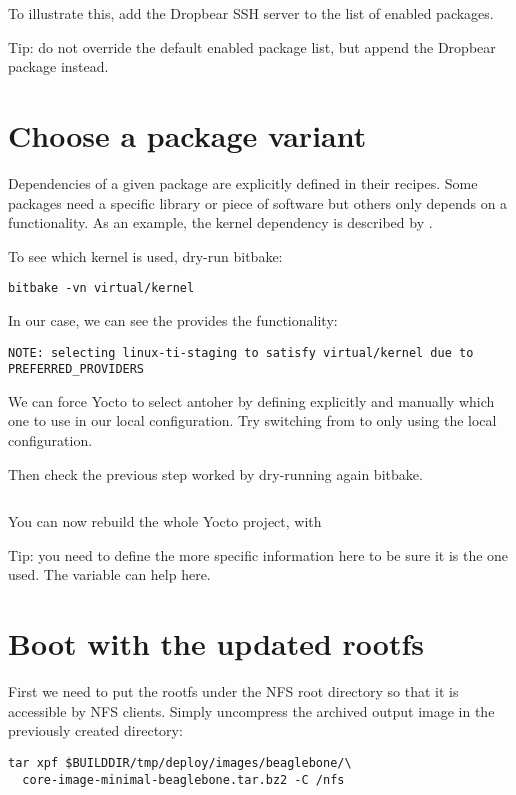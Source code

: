 To illustrate this, add the Dropbear SSH server to the list of enabled
packages.

Tip: do not override the default enabled package list, but append the Dropbear
package instead.

\section{Choose a package variant}

Dependencies of a given package are explicitly defined in their recipes. Some
packages need a specific library or piece of software but others only depends on
a functionality. As an example, the kernel dependency is described by
.

To see which kernel is used, dry-run bitbake:
\begin{verbatim}
bitbake -vn virtual/kernel
\end{verbatim}

In our case, we can see the  provides the
 functionality:
\begin{verbatim}
NOTE: selecting linux-ti-staging to satisfy virtual/kernel due to PREFERRED_PROVIDERS
\end{verbatim}

We can force Yocto to select antoher  by defining explicitly and
manually which one to use in our local configuration. Try switching from
 to  only using the local
configuration.

Then check the previous step worked by dry-running again bitbake.
\begin{verbatim}
\end{verbatim}

You can now rebuild the whole Yocto project, with 

Tip: you need to define the more specific information here to be sure it is the
one used. The  variable can help here.

\section{Boot with the updated rootfs}

First we need to put the rootfs under the NFS root directory so that it is
accessible by NFS clients. Simply uncompress the archived output image in the
previously created  directory:
\begin{verbatim}
tar xpf $BUILDDIR/tmp/deploy/images/beaglebone/\
  core-image-minimal-beaglebone.tar.bz2 -C /nfs
\end{verbatim}


